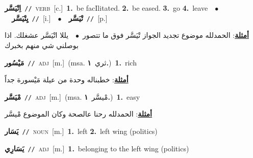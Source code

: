 \documentclass[10pt,a4paper,twoside]{article} %
\begin{document}
\begin{multicols}{2}
{{{{\setlength\topsep{0pt}\textbf{\foreignlanguage{arabic}{اِتْيَسَّر}}\ {\color{gray}\texttt{//}\color{black}}\ \textsc{verb}\ [c.]\ \textbf{1.}~be facIlitated.  \textbf{2.}~be eased.  \textbf{3.}~go  \textbf{4.}~leave\ \ $\bullet$\ \ \setlength\topsep{0pt}\textbf{\foreignlanguage{arabic}{يِتْيَسَّر}}\ {\color{gray}\texttt{//}\color{black}}\ [i.]\ \ $\bullet$\ \ \setlength\topsep{0pt}\textbf{\foreignlanguage{arabic}{تْيَسَّر}}\ {\color{gray}\texttt{//}\color{black}}\ [p.]\  \begin{flushright}\color{gray}\foreignlanguage{arabic}{\textbf{\underline{\foreignlanguage{arabic}{أمثلة}}}: الحمدلله موضوع تجديد الجواز تْيَسَّر فوق ما تتصور\ $\bullet$\ \  يللا اتْيَسَّر عشغلك. اذا بوصلني شي منهم بخبرك}\end{flushright}\color{black}} \vspace{2mm}

{\setlength\topsep{0pt}\textbf{\foreignlanguage{arabic}{مَيْسُور}}\ {\color{gray}\texttt{//}\color{black}}\ \textsc{adj}\ [m.]\ \color{gray}(msa. \foreignlanguage{arabic}{ثري}~\foreignlanguage{arabic}{\textbf{١.}})\color{black}\ \textbf{1.}~rich\  \begin{flushright}\color{gray}\foreignlanguage{arabic}{\textbf{\underline{\foreignlanguage{arabic}{أمثلة}}}: خطبناله وحدة من عيلة مَيْسورة جداً}\end{flushright}\color{black}} \vspace{2mm}

{\setlength\topsep{0pt}\textbf{\foreignlanguage{arabic}{مْيَسَّر}}\ {\color{gray}\texttt{//}\color{black}}\ \textsc{adj}\ [m.]\ \color{gray}(msa. \foreignlanguage{arabic}{مْيسَّر}~\foreignlanguage{arabic}{\textbf{١.}})\color{black}\ \textbf{1.}~easy\  \begin{flushright}\color{gray}\foreignlanguage{arabic}{\textbf{\underline{\foreignlanguage{arabic}{أمثلة}}}: الحمدلله رحنا عالصحة وكان الموضوع مْيسَّر}\end{flushright}\color{black}} \vspace{2mm}

{\setlength\topsep{0pt}\textbf{\foreignlanguage{arabic}{يَسَار}}\ {\color{gray}\texttt{//}\color{black}}\ \textsc{noun}\ [m.]\ \textbf{1.}~left  \textbf{2.}~left wing (politics)\ 

{\setlength\topsep{0pt}\textbf{\foreignlanguage{arabic}{يَسَارِي}}\ {\color{gray}\texttt{//}\color{black}}\ \textsc{adj}\ [m.]\ \textbf{1.}~belonging to the left wing (politics)\ 

}}}}}
\end{multicols}
\end{document}
